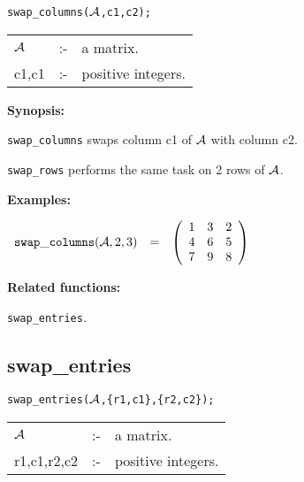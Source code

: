 
\hspace*{0.175in} {\tt swap\_columns(${\cal A}$,c1,c2);}

\hspace*{0.1in} 
\begin{tabular}{l l l}
${\cal A}$ &:-& a matrix. \\
c1,c1      &:-& positive integers. 
\end{tabular}

{\bf Synopsis:} %

\hspace*{0.175in} 
{\tt swap\_columns} swaps column c1 of ${\cal A}$ with column c2. 

\hspace*{0.175in} {\tt swap\_rows} performs the same task on 2 rows of 
                ${\cal A}$.

{\bf Examples:}

\begin{flushleft}  
\hspace*{0.1in}
\begin{math}  
\begin{array}{ccc}
{\tt swap\_columns}({\cal A},2,3) & = & 
        \left( \begin{array}{ccc} 1 & 3 & 2 \\ 4 & 6 & 5 \\ 7 & 9 & 8
 \end{array} \right) 
\end{array}
\end{math}  
\end{flushleft}

{\bf Related functions:}

\hspace*{0.175in} {\tt swap\_entries}.


\subsection{swap\_entries}


\hspace*{0.175in} {\tt swap\_entries(${\cal A}$,\{r1,c1\},\{r2,c2\});}

\hspace*{0.1in}  
\begin{tabular}{l l l} 
${\cal A}$  &:-& a matrix. \\
r1,c1,r2,c2 &:-& positive integers.
\end{tabular}

